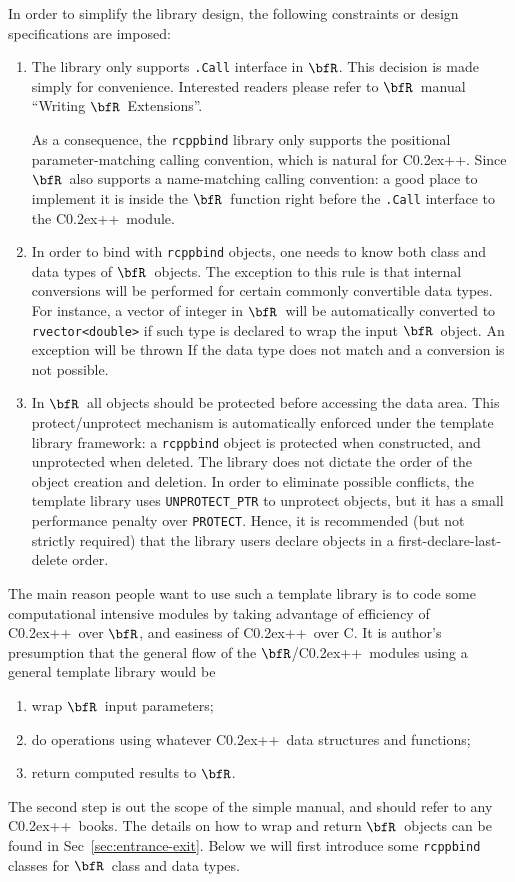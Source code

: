 \documentclass{article}
\def\C++{C{\raise 0.2ex\hbox{++}}}
\newcommand{\R}{$\bfR$}
\begin{document}
In order to simplify the library design, the following
constraints or design specifications are imposed:
\begin{enumerate}
  \item The library only supports \texttt{.Call} interface in
    \R. This decision is made simply for convenience.
    Interested readers please refer to \R\ manual ``Writing
    \R\ Extensions''.
  
    As a consequence, the \texttt{rcppbind} library only
    supports the positional parameter-matching calling
    convention, which is natural for \C++. Since \R\
    also supports a name-matching calling convention: a good
    place to implement it is inside the \R\ function right
    before the \texttt{.Call} interface to the \C++\ module.
  \item In order to bind with \texttt{rcppbind} objects, one
    needs to know both class and data types of \R\ objects.
    The exception to this rule is that internal conversions
    will be performed for certain commonly convertible data
    types. For instance, a vector of integer in \R\ will be
    automatically converted to \texttt{rvector<double>}
    if such type is declared to wrap the input \R\ object. An
    exception will be thrown If the data type does not match
    and a conversion is not possible.
  \item In \R\, all objects should be protected before
    accessing the data area. This protect/unprotect mechanism
    is automatically enforced under the template library
    framework: a \texttt{rcppbind} object is protected
    when constructed, and unprotected when deleted. The
    library does not dictate the order of the object creation
    and deletion. In order to eliminate possible conflicts,
    the template library uses \texttt{UNPROTECT\_PTR} to
    unprotect objects, but it has a small performance penalty
    over \texttt{PROTECT}. Hence, it is recommended (but not
    strictly required) that the library users declare objects
    in a first-declare-last-delete order.
\end{enumerate}

The main reason people want to use such a template library is
to code some computational intensive modules by taking
advantage of efficiency of \C++\ over \R, and easiness of
\C++\ over C. It is author's presumption that the general
flow of the \R/\C++\ modules using a general template library
would be
\begin{enumerate}
  \item wrap \R\ input parameters;
  \item do operations using whatever \C++\ data structures
    and functions;
  \item return computed results to \R.
\end{enumerate}
The second step is out the scope of the simple manual, and
should refer to any \C++\ books. The details on how to wrap
and return \R\ objects can be found in
Sec~\ref{sec:entrance-exit}. Below we will first introduce
some \texttt{rcppbind} classes for \R\ class and data types.
\end{document}
